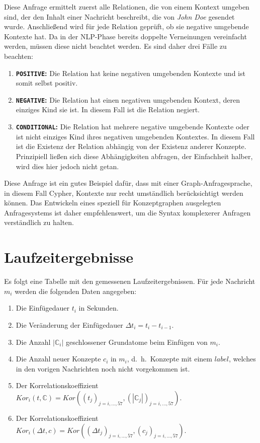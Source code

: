 \inputminted{cypher}{data/evaluation/personNegationAction.cql}
Diese Anfrage ermittelt zuerst alle Relationen, die von einem Kontext umgeben sind, der den Inhalt einer Nachricht beschreibt, die von \textit{John Doe} gesendet wurde.
Anschließend wird für jede Relation geprüft, ob sie negative umgebende Kontexte hat.
Da in der NLP-Phase bereits doppelte Verneinungen vereinfacht werden, müssen diese nicht beachtet werden.
Es sind daher drei Fälle zu beachten:
\begin{enumerate}
	\item \textbf{\texttt{POSITIVE}:}
		Die Relation hat keine negativen umgebenden Kontexte und ist somit selbst positiv.
	\item \textbf{\texttt{NEGATIVE}:}
		Die Relation hat einen negativen umgebenden Kontext, deren einziges Kind sie ist.
		In diesem Fall ist die Relation negiert.
	\item \textbf{\texttt{CONDITIONAL}:}
		Die Relation hat mehrere negative umgebende Kontexte oder ist nicht einziges Kind ihres negativen umgebenden Kontextes.
		In diesem Fall ist die Existenz der Relation abhängig von der Existenz anderer Konzepte.
		Prinzipiell ließen sich diese Abhängigkeiten abfragen, der Einfachheit halber, wird dies hier jedoch nicht getan.
\end{enumerate}
Diese Anfrage ist ein gutes Beispiel dafür, dass mit einer Graph-Anfragesprache, in diesem Fall Cypher, Kontexte nur recht umständlich berücksichtigt werden können.
Das Entwickeln eines speziell für Konzeptgraphen ausgelegten Anfragesystems ist daher empfehlenswert, um die Syntax komplexerer Anfragen verständlich zu halten.

\section{Laufzeitergebnisse}%
\label{sec:appendix:perf}

Es folgt eine Tabelle mit den gemessenen Laufzeitergebnissen.
Für jede Nachricht $m_i$ werden die folgenden Daten angegeben:
\begin{enumerate}[noitemsep]
	\item Die Einfügedauer $t_i$ in Sekunden.
	\item Die Veränderung der Einfügedauer $\Delta t_i = t_i - t_{i - 1}$.
	\item Die Anzahl $|\mathbb{C}_i|$ geschlossener Grundatome beim Einfügen von $m_i$.
	\item Die Anzahl neuer Konzepte $c_i$ in $m_i$, d.~h.\ Konzepte mit einem $label$, welches in den vorigen Nachrichten noch nicht vorgekommen ist.
	\item Der Korrelationskoeffizient $Kor_i(t, \mathbb{C}) = Kor({(t_j)}_{j = i, \dots, 57}, {(|\mathbb{C}_j|)}_{j = i, \dots, 57})$.
	\item Der Korrelationskoeffizient $Kor_i(\Delta t, c) = Kor({(\Delta t_j)}_{j = i, \dots, 57}, {(c_j)}_{j = i, \dots, 57})$.
\end{enumerate}
\def\ikor{$Kor_i(t, \mathbb{C})$}
\def\ckor{$Kor_i(\Delta t, c)$}

